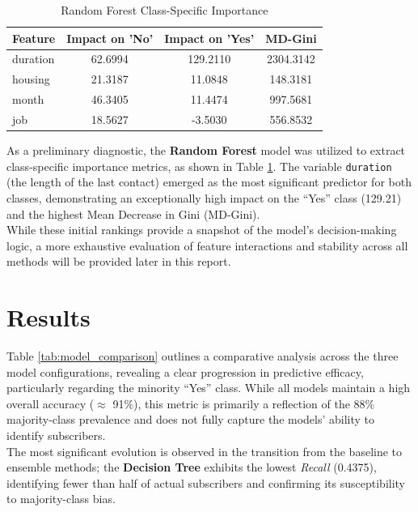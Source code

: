 \documentclass[conference]{IEEEtran}
\begin{document}
\begin{table}[ht]
	\centering
	\caption{Random Forest Class-Specific Importance}
	\label{tab:rf_class_imp}
	\begin{tabular}{lccc}
		\hline \hline
		\textbf{Feature} & \textbf{Impact on 'No'} & \textbf{Impact on 'Yes'} & \textbf{MD-Gini} \\
		\hline
		duration  & 62.6994 & 129.2110 & 2304.3142 \\
		housing   & 21.3187 & 11.0848  & 148.3181  \\
		month     & 46.3405 & 11.4474  & 997.5681  \\
		job       & 18.5627 & -3.5030  & 556.8532  \\
		\hline \hline
	\end{tabular}
\end{table}

\newpage As a preliminary diagnostic, the \textbf{Random Forest} model was utilized to extract class-specific importance metrics, as shown in Table \ref{tab:rf_class_imp}. The variable \texttt{duration} (the length of the last contact) emerged as the most significant predictor for both classes, demonstrating an exceptionally high impact on the ``Yes'' class (129.21) and the highest Mean Decrease in Gini (MD-Gini).\\
\indent While these initial rankings provide a snapshot of the model's decision-making logic, a more exhaustive evaluation of feature interactions and stability across all  methods will be provided later in this report.

\section{\textbf{Results}}

Table \ref{tab:model_comparison} outlines a comparative analysis across the three model configurations, revealing a clear progression in predictive efficacy, particularly regarding the minority ``Yes'' class. While all models maintain a high overall accuracy ($\approx$ 91\%), this metric is primarily a reflection of the 88\% majority-class prevalence and does not fully capture the models' ability to identify subscribers.\\
\indent The most significant evolution is observed in the transition from the baseline to ensemble methods; the \textbf{Decision Tree} exhibits the lowest \textit{Recall} (0.4375), identifying fewer than half of actual subscribers and confirming its susceptibility to majority-class bias.
 
\end{document}
